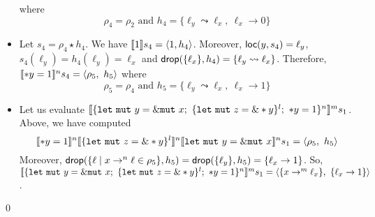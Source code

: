 \begin{example}
\begin{itemize}
    where
    \[\rho_4 = \rho_2 \text{ and } h_4 = \{\ell_y\leadsto \ell_x,\ \ell_x\to 0\}\]
    \item Let $s_4 = \rho_4 \star h_4$.
    We have $\den[1]{s_4} = \langle 1,h_4\rangle$. Moreover,
    $\loc(y,s_4) = \ell_y$, $s_4(\ell_y) = h_4(\ell_y) = \ell_x$ and
    $\drop(\{\ell_x\}, h_4) = \{\ell_y\leadsto \ell_x\}$. Therefore,
    $\denl[*y = 1]{n}{s_4}=\langle \rho_5,\ h_5\rangle$ where
    \[\rho_5 = \rho_4 \text{ and } h_5 = \{\ell_y\leadsto \ell_x,\ \ell_x\to 1\}\]
    \item Let us evaluate $\denl[\{\mathtt{let\ mut}\ y = \mutborrow x;\
    \{ \mathtt{let\ mut}\ z = \borrow*y \}^l;\ *y = 1 \}^n]{m}{s_1}$.
    Above, we have computed
    \[\denl[*y = 1]{n}{
      \denl[\{\mathtt{let\ mut}\ z = \borrow*y\}^l]{n}{
        \denl[\mathtt{let\ mut}\ y = \mutborrow x]{n}{s_1}
      } = \langle \rho_5,\ h_5\rangle
    }\]
    Moreover, $\drop(\{\ell\mid x\to^n\ell\in\rho_5\},h_5) =
    \drop(\{\ell_y\},h_5) = \{\ell_x\to 1\}$. So,
    $\denl[\{\mathtt{let\ mut}\ y = \mutborrow x;\
    \{ \mathtt{let\ mut}\ z = \borrow*y \}^l;\ *y = 1 \}^n]{m}{s_1} =
    \langle \{x\to^m\ell_x\},\ \{\ell_x\to 1\}\rangle$.
  \end{itemize}
  \qed
\end{example}


